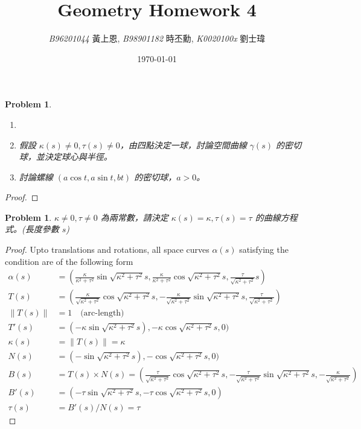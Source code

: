 \documentclass[10pt,a4paper]{article}
\newcommand{\LiHei}{\CJKfamily{lh}}
\newcounter{theProblemCounter}
\newtheorem{problem}[theProblemCounter]{Problem}
\begin{document}
\title{{Geometry Homework 4}}
\author{{\it{B96201044}} {\LiHei 黃上恩}, {\it{B98901182}} {\LiHei 時丕勳}, {\it{K0020100x}} {\LiHei 劉士瑋}}
\date{\today}
\maketitle

\setcounter{theProblemCounter}{2}
\begin{problem}
\begin{enumerate}
\item[]
\item[(a)] 假設 $\kappa(s)\ne 0, \tau(s)\ne 0$，由四點決定一球，討論空間曲線 $\gamma(s)$ 的密切球，並決定球心與半徑。
\item[(b)] 討論螺線 $(a\cos t, a\sin t, bt)$ 的密切球，$a>0$。
\end{enumerate}
\end{problem}
\begin{proof}
\end{proof}

\setcounter{theProblemCounter}{3}
\begin{problem}
$\kappa\ne 0, \tau \ne 0$ 為兩常數，請決定 $\kappa(s)=\kappa, \tau(s)=\tau$ 的曲線方程式。(長度參數 $s$)
\end{problem}
\begin{proof}
Upto translations and rotations, all space curves $\alpha(s)$ satisfying the condition are of the following form
\begin{align*}
\alpha(s) &= (\frac{\kappa}{\kappa^2 + \tau^2}\sin\sqrt{\kappa^2 + \tau^2}s, \frac{\kappa}{\kappa^2 + \tau^2}\cos\sqrt{\kappa^2 + \tau^2}s, \frac{\tau}{\sqrt{\kappa^2 + \tau^2}}s) \\
T(s) &= (\frac{\kappa}{\sqrt{\kappa^2 + \tau^2}}\cos\sqrt{\kappa^2 + \tau^2}s, -\frac{\kappa}{\sqrt{\kappa^2 + \tau^2}}\sin\sqrt{\kappa^2 + \tau^2}s, \frac{\tau}{\sqrt{\kappa^2 + \tau^2}}) \\
\|T(s)\| &= 1 \quad\text{(arc-length)}\\
T'(s) &= (-\kappa\sin\sqrt{\kappa^2 + \tau^2}s), -\kappa\cos\sqrt{\kappa^2 + \tau^2}s, 0) \\
\kappa(s) &= \|T(s)\| = \kappa \\
N(s) &= (-\sin\sqrt{\kappa^2 + \tau^2}s), -\cos\sqrt{\kappa^2 + \tau^2}s, 0) \\
B(s) &= T(s)\times N(s) = (\frac{\tau}{\sqrt{\kappa^2 + \tau^2}}\cos\sqrt{\kappa^2 + \tau^2}s, -\frac{\tau}{\sqrt{\kappa^2 + \tau^2}}\sin\sqrt{\kappa^2 + \tau^2}s, -\frac{\kappa}{\sqrt{\kappa^2 + \tau^2}}) \\
B'(s) &= (-\tau\sin\sqrt{\kappa^2 + \tau^2}s, -\tau\cos\sqrt{\kappa^2 + \tau^2}s, 0) \\
\tau(s) &= B'(s)/N(s) = \tau
\end{align*}
\end{proof}
\end{document}
